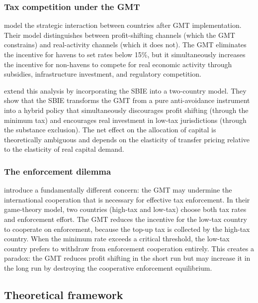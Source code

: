 \documentclass[11pt,a4paper]{article}
\begin{document}
\subsubsection{Tax competition under the GMT}

\citet{janeba2023} model the strategic interaction between countries after GMT implementation. Their model distinguishes between profit-shifting channels (which the GMT constrains) and real-activity channels (which it does not). The GMT eliminates the incentive for havens to set rates below 15\%, but it simultaneously increases the incentive for non-havens to compete for real economic activity through subsidies, infrastructure investment, and regulatory competition.

\citet{schjelderup2024} extend this analysis by incorporating the SBIE into a two-country model. They show that the SBIE transforms the GMT from a pure anti-avoidance instrument into a hybrid policy that simultaneously discourages profit shifting (through the minimum tax) and encourages real investment in low-tax jurisdictions (through the substance exclusion). The net effect on the allocation of capital is theoretically ambiguous and depends on the elasticity of transfer pricing relative to the elasticity of real capital demand.

\subsubsection{The enforcement dilemma}

\citet{jean2026} introduce a fundamentally different concern: the GMT may undermine the international cooperation that is necessary for effective tax enforcement. In their game-theory model, two countries (high-tax and low-tax) choose both tax rates and enforcement effort. The GMT reduces the incentive for the low-tax country to cooperate on enforcement, because the top-up tax is collected by the high-tax country. When the minimum rate exceeds a critical threshold, the low-tax country prefers to withdraw from enforcement cooperation entirely. This creates a paradox: the GMT reduces profit shifting in the short run but may increase it in the long run by destroying the cooperative enforcement equilibrium.

\subsection{Theoretical framework}\label{sec:theoretical_framework}
\end{document}
